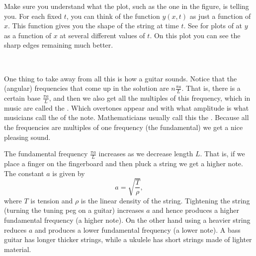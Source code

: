 \documentclass{ximera}
\begin{document}
\begin{example}
    Make sure you understand what the plot, such as the one in the figure, is telling you.  For each fixed $t$, you can think of the function $y(x,t)$ as just a function of $x$.  This function gives you the shape of the string at time $t$.  See  for plots of at $y$ as a function of $x$ at several different values of $t$. On this plot you can see the sharp edges remaining much better.
    
    \begin{myfig}
        \capstart
         \\[5pt]
        \caption{Plucked string for $t=0$, $t=0.4$, $t=0.8$, and $t=1.2$.%
        \label{wave:pluckedtsfig}}
    \end{myfig}
\end{example}

One thing to take away from all this is how a guitar sounds.  Notice that the (angular) frequencies that come up in the solution are $n \frac{\pi a}{L}$.  That is, there is a certain base \emph{} $\frac{\pi a}{L}$, and then we also get all the multiples of this frequency, which in music are called the \emph{}.  Which overtones appear and with what amplitude is what musicians call the \emph{} of the note. Mathematicians usually call this the \emph{}. Because all the frequencies are multiples of one frequency (the fundamental) we get a nice pleasing sound.

The fundamental frequency $\frac{\pi a}{L}$ increases as we decrease length $L$.  That is, if we place a finger on the fingerboard and then pluck a string we get a higher note.  The constant $a$ is given by
\begin{equation*}
    a = \sqrt{\frac{T}{\rho}} ,
\end{equation*}
where $T$ is tension and $\rho$ is the linear density of the string. Tightening the string (turning the tuning peg on a guitar) increases $a$ and hence produces a higher fundamental frequency (a higher note). On the other hand using a heavier string reduces $a$ and produces a lower fundamental frequency (a lower note). A bass guitar has longer thicker strings, while a ukulele has short strings made of lighter material.
\end{document}

